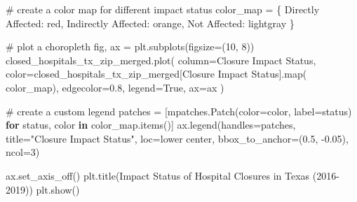 \documentclass[
  letterpaper,
  DIV=11,
  numbers=noendperiod]{scrartcl}
\newenvironment{Shaded}{\begin{snugshade}}{\end{snugshade}}
\newcommand{\BuiltInTok}[1]{\textcolor[rgb]{0.00,0.23,0.31}{#1}}
\newcommand{\CommentTok}[1]{\textcolor[rgb]{0.37,0.37,0.37}{#1}}
\newcommand{\ControlFlowTok}[1]{\textcolor[rgb]{0.00,0.23,0.31}{\textbf{#1}}}
\newcommand{\DecValTok}[1]{\textcolor[rgb]{0.68,0.00,0.00}{#1}}
\newcommand{\FloatTok}[1]{\textcolor[rgb]{0.68,0.00,0.00}{#1}}
\newcommand{\KeywordTok}[1]{\textcolor[rgb]{0.00,0.23,0.31}{\textbf{#1}}}
\newcommand{\NormalTok}[1]{\textcolor[rgb]{0.00,0.23,0.31}{#1}}
\newcommand{\OperatorTok}[1]{\textcolor[rgb]{0.37,0.37,0.37}{#1}}
\newcommand{\StringTok}[1]{\textcolor[rgb]{0.13,0.47,0.30}{#1}}
\newcommand{\VariableTok}[1]{\textcolor[rgb]{0.07,0.07,0.07}{#1}}
\begin{document}
\begin{Shaded}
\begin{Highlighting}[]
\CommentTok{\# create a color map for different impact status}
\NormalTok{color\_map }\OperatorTok{=}\NormalTok{ \{}
    \StringTok{\textquotesingle{}Directly Affected\textquotesingle{}}\NormalTok{: }\StringTok{\textquotesingle{}red\textquotesingle{}}\NormalTok{,}
    \StringTok{\textquotesingle{}Indirectly Affected\textquotesingle{}}\NormalTok{: }\StringTok{\textquotesingle{}orange\textquotesingle{}}\NormalTok{,}
    \StringTok{\textquotesingle{}Not Affected\textquotesingle{}}\NormalTok{: }\StringTok{\textquotesingle{}lightgray\textquotesingle{}}
\NormalTok{\}}

\CommentTok{\# plot a choropleth}
\NormalTok{fig, ax }\OperatorTok{=}\NormalTok{ plt.subplots(figsize}\OperatorTok{=}\NormalTok{(}\DecValTok{10}\NormalTok{, }\DecValTok{8}\NormalTok{))}
\NormalTok{closed\_hospitals\_tx\_zip\_merged.plot(}
\NormalTok{    column}\OperatorTok{=}\StringTok{\textquotesingle{}Closure Impact Status\textquotesingle{}}\NormalTok{,}
\NormalTok{    color}\OperatorTok{=}\NormalTok{closed\_hospitals\_tx\_zip\_merged[}\StringTok{\textquotesingle{}Closure Impact Status\textquotesingle{}}\NormalTok{].}\BuiltInTok{map}\NormalTok{(}
\NormalTok{        color\_map),}
\NormalTok{    edgecolor}\OperatorTok{=}\StringTok{\textquotesingle{}0.8\textquotesingle{}}\NormalTok{,}
\NormalTok{    legend}\OperatorTok{=}\VariableTok{True}\NormalTok{,}
\NormalTok{    ax}\OperatorTok{=}\NormalTok{ax}
\NormalTok{)}

\CommentTok{\# create a custom legend}
\NormalTok{patches }\OperatorTok{=}\NormalTok{ [mpatches.Patch(color}\OperatorTok{=}\NormalTok{color, label}\OperatorTok{=}\NormalTok{status)}
           \ControlFlowTok{for}\NormalTok{ status, color }\KeywordTok{in}\NormalTok{ color\_map.items()]}
\NormalTok{ax.legend(handles}\OperatorTok{=}\NormalTok{patches, title}\OperatorTok{=}\StringTok{"Closure Impact Status"}\NormalTok{,}
\NormalTok{          loc}\OperatorTok{=}\StringTok{\textquotesingle{}lower center\textquotesingle{}}\NormalTok{, bbox\_to\_anchor}\OperatorTok{=}\NormalTok{(}\FloatTok{0.5}\NormalTok{, }\OperatorTok{{-}}\FloatTok{0.05}\NormalTok{), ncol}\OperatorTok{=}\DecValTok{3}\NormalTok{)}

\NormalTok{ax.set\_axis\_off()}
\NormalTok{plt.title(}\StringTok{\textquotesingle{}Impact Status of Hospital Closures in Texas (2016{-}2019)\textquotesingle{}}\NormalTok{)}
\NormalTok{plt.show()}
\end{Highlighting}
\end{Shaded}
\end{document}

